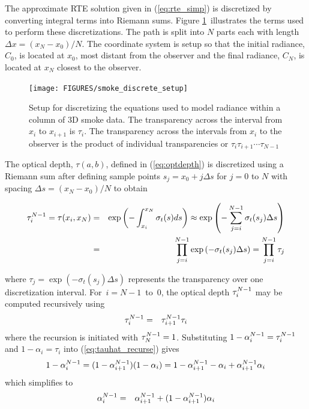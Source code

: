 The approximate RTE solution given in (\ref{eq:rte_simp}) is discretized by converting integral terms into Riemann sums. Figure \ref{fig:smokediscretesetup}\ illustrates the terms used to perform these discretizations.  The path is split into $N$ parts each with length $\Delta x=(x_N-x_0)/N$.  The coordinate system is setup so that the initial radiance, $C_0$, is located at $x_0$, most distant from the observer and the final radiance, $C_N$, is located at $x_N$ closest to the observer.

\begin{figure}[\figoptions]
\begin{center}
\texttt{[image: FIGURES/smoke\_discrete\_setup]}
\end{center}
\caption[Setup for discretizing the equations used to model
radiance within a column of 3D smoke data.]{Setup for discretizing the equations used to model
radiance within a column of 3D smoke data. The transparency across the interval from $x_i$ to $x_{i+1}$ is $\tau_i$. The transparency across the intervals from $x_i$ to the observer is the product of individual transparencies or $\tau_i\tau_{i+1}\cdots\tau_{N-1}$}
\label{fig:smokediscretesetup}
\end{figure}

The optical depth, $\tau(a,b)$, defined in (\ref{eq:optdepth}) is discretized using a Riemann sum  after defining sample points $s_j=x_0+j\Delta s$ for $j=0$ to $N$ with spacing $\Delta s=(x_N-x_0)/N$ to obtain

\begin{eqnarray*}
\tau_{i}^{N-1}=\tau(x_i,x_N)&=&\exp\left(-\int_{x_i}^{x_N}\sigma_t(s)ds\right)\approx\exp\left(-\sum_{j=i}^{N-1}\sigma_t(s_j)\Delta s\right)\\
&=&\prod_{j=i}^{N-1}\exp\left(-\sigma_t(s_j)\Delta s\right)=\prod_{j=i}^{N-1}\tau_j
\end{eqnarray*}

where $\tau_j=\exp\left(-\sigma_t(s_j)\Delta s\right)$ represents the transparency over one discretization interval.
For~$i=N-1$~to~$0$, the optical depth $\tau_{i}^{N-1}$ may be computed recursively using
\begin{eqnarray}
\label{eq:tauhat_recurse}
\tau_{i}^{N-1}&=&\tau_{i+1}^{N-1}\tau_i
\end{eqnarray}
where the recursion is initiated with $\tau_{N}^{N-1}=1$.
Substituting $1-\alpha_{i}^{N-1}=\tau_{i}^{N-1}$ and $1-\alpha_i=\tau_i$ into (\ref{eq:tauhat_recurse}) gives
\begin{eqnarray*}
1-\alpha_{i}^{N-1}=(1-\alpha_{i+1}^{N-1})(1-\alpha_i)=1-\alpha_{i+1}^{N-1} - \alpha_i + \alpha_{i+1}^{N-1}\alpha_i
\end{eqnarray*}
which simplifies to
\begin{eqnarray}
\label{eq:alpha2}
\alpha_{i}^{N-1}&=&\alpha_{i+1}^{N-1} + (1-\alpha_{i+1}^{N-1})\alpha_i
\end{eqnarray}

